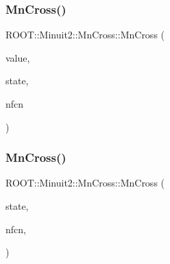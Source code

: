 \mbox{\label{classROOT_1_1Minuit2_1_1MnCross_a4b4c9d92105b2517789094d86eecee57}} 
\subsubsection{\texorpdfstring{MnCross()}{MnCross()}\hspace{0.1cm}{\footnotesize\ttfamily [12/24]}}
{\footnotesize\ttfamily R\+O\+O\+T\+::\+Minuit2\+::\+Mn\+Cross\+::\+Mn\+Cross (\begin{DoxyParamCaption}\item[{double}]{value,  }\item[{const \mbox{\hyperlink{classROOT_1_1Minuit2_1_1MnUserParameterState}{Mn\+User\+Parameter\+State}} \&}]{state,  }\item[{unsigned int}]{nfcn }\end{DoxyParamCaption})\hspace{0.3cm}{\ttfamily [inline]}}

\mbox{\label{classROOT_1_1Minuit2_1_1MnCross_aea436e84ebb882f376cfdc90b8846660}} 
\subsubsection{\texorpdfstring{MnCross()}{MnCross()}\hspace{0.1cm}{\footnotesize\ttfamily [13/24]}}
{\footnotesize\ttfamily R\+O\+O\+T\+::\+Minuit2\+::\+Mn\+Cross\+::\+Mn\+Cross (\begin{DoxyParamCaption}\item[{const \mbox{\hyperlink{classROOT_1_1Minuit2_1_1MnUserParameterState}{Mn\+User\+Parameter\+State}} \&}]{state,  }\item[{unsigned int}]{nfcn,  }\item[{\mbox{\hyperlink{classROOT_1_1Minuit2_1_1MnCross_1_1CrossParLimit}{Cross\+Par\+Limit}}}]{ }\end{DoxyParamCaption})\hspace{0.3cm}{\ttfamily [inline]}}

\mbox{\label{classROOT_1_1Minuit2_1_1MnCross_ad306883aae64c6bd2d4acd8adbb28c9e}} 
